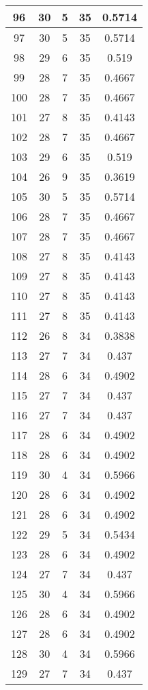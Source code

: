 \documentclass[letterpaper, 12pt]{article}
\begin{document}
\begin{longtable}{|c|c|c|c|c|}
\hline
96 & 30 & 5 & 35 & 0.5714 \\
\hline
97 & 30 & 5 & 35 & 0.5714 \\
\hline
98 & 29 & 6 & 35 & 0.519 \\
\hline
99 & 28 & 7 & 35 & 0.4667 \\
\hline
100 & 28 & 7 & 35 & 0.4667 \\
\hline
101 & 27 & 8 & 35 & 0.4143 \\
\hline
102 & 28 & 7 & 35 & 0.4667 \\
\hline
103 & 29 & 6 & 35 & 0.519 \\
\hline
104 & 26 & 9 & 35 & 0.3619 \\
\hline
105 & 30 & 5 & 35 & 0.5714 \\
\hline
106 & 28 & 7 & 35 & 0.4667 \\
\hline
107 & 28 & 7 & 35 & 0.4667 \\
\hline
108 & 27 & 8 & 35 & 0.4143 \\
\hline
109 & 27 & 8 & 35 & 0.4143 \\
\hline
110 & 27 & 8 & 35 & 0.4143 \\
\hline
111 & 27 & 8 & 35 & 0.4143 \\
\hline
112 & 26 & 8 & 34 & 0.3838 \\
\hline
113 & 27 & 7 & 34 & 0.437 \\
\hline
114 & 28 & 6 & 34 & 0.4902 \\
\hline
115 & 27 & 7 & 34 & 0.437 \\
\hline
116 & 27 & 7 & 34 & 0.437 \\
\hline
117 & 28 & 6 & 34 & 0.4902 \\
\hline
118 & 28 & 6 & 34 & 0.4902 \\
\hline
119 & 30 & 4 & 34 & 0.5966 \\
\hline
120 & 28 & 6 & 34 & 0.4902 \\
\hline
121 & 28 & 6 & 34 & 0.4902 \\
\hline
122 & 29 & 5 & 34 & 0.5434 \\
\hline
123 & 28 & 6 & 34 & 0.4902 \\
\hline
124 & 27 & 7 & 34 & 0.437 \\
\hline
125 & 30 & 4 & 34 & 0.5966 \\
\hline
126 & 28 & 6 & 34 & 0.4902 \\
\hline
127 & 28 & 6 & 34 & 0.4902 \\
\hline
128 & 30 & 4 & 34 & 0.5966 \\
\hline
129 & 27 & 7 & 34 & 0.437 \\

\end{longtable}
\end{document}
